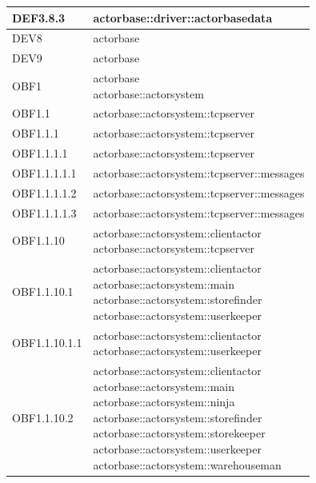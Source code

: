 \documentclass{scalatekids-article}
\begin{document}
\begin{longtable}[H]{|p{3.5cm}|p{7.5cm}|}
  \hline
  DEF3.8.3 & \multiLineCell[t]{actorbase::driver::actorbasedata\\}\\
  \hline
  DEV8 & \multiLineCell[t]{actorbase\\}\\
  \hline
  DEV9 & \multiLineCell[t]{actorbase\\}\\
  \hline
  OBF1 & \multiLineCell[t]{actorbase\\actorbase::actorsystem\\}\\
  \hline
  OBF1.1 & \multiLineCell[t]{actorbase::actorsystem::tcpserver\\}\\
  \hline
  OBF1.1.1 & \multiLineCell[t]{actorbase::actorsystem::tcpserver\\}\\
  \hline
  OBF1.1.1.1 & \multiLineCell[t]{actorbase::actorsystem::tcpserver\\}\\
  \hline
  OBF1.1.1.1.1 & \multiLineCell[t]{actorbase::actorsystem::tcpserver::messages\\}\\
  \hline
  OBF1.1.1.1.2 & \multiLineCell[t]{actorbase::actorsystem::tcpserver::messages\\}\\
  \hline
  OBF1.1.1.1.3 & \multiLineCell[t]{actorbase::actorsystem::tcpserver::messages\\}\\
  \hline
  OBF1.1.10 & \multiLineCell[t]{actorbase::actorsystem::clientactor\\actorbase::actorsystem::tcpserver\\}\\
  \hline
  OBF1.1.10.1 & \multiLineCell[t]{actorbase::actorsystem::clientactor\\actorbase::actorsystem::main\\actorbase::actorsystem::storefinder\\actorbase::actorsystem::userkeeper\\}\\
  \hline
  OBF1.1.10.1.1 & \multiLineCell[t]{actorbase::actorsystem::clientactor\\actorbase::actorsystem::userkeeper\\}\\
  \hline
  OBF1.1.10.2 & \multiLineCell[t]{actorbase::actorsystem::clientactor\\actorbase::actorsystem::main\\actorbase::actorsystem::ninja\\actorbase::actorsystem::storefinder\\actorbase::actorsystem::storekeeper\\actorbase::actorsystem::userkeeper\\actorbase::actorsystem::warehouseman\\}\\

\end{longtable}
\end{document}
